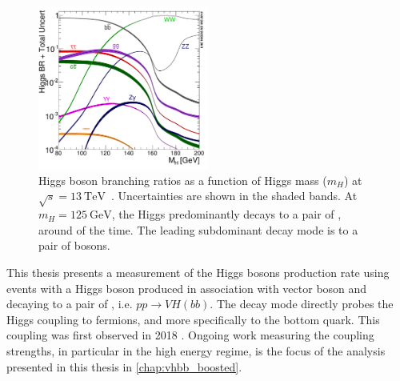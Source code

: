 \begin{figure}[!htbp]
  \centering
  \includegraphics[width=0.5\textwidth]{chapters/1.theory/figs/Higgs_BR_LM.pdf}
  \caption{
    Higgs boson branching ratios as a function of Higgs mass ($m_H$) at $\sqrt{s} = \SI{13}{\TeV}$~\cite{deFlorian:2016spz}.
    Uncertainties are shown in the shaded bands.
    At $m_H = \SI{125}{\GeV}$, the Higgs predominantly decays to a pair of \bquarks, around  of the time.
    The leading subdominant decay mode is to a pair of \Wboson bosons.
    }
  \label{fig:higgs_br}
\end{figure}

This thesis presents a measurement of the Higgs bosons production rate using events with a Higgs boson produced in association with vector boson and decaying to a pair of \bquarks, i.e. $pp \rightarrow VH(bb)$.
The \Hbb decay mode directly probes the Higgs coupling to fermions, and more specifically to the bottom quark.
This coupling was first observed in 2018 \cite{ATLAS-CONF-2018-036,CMS-HIG-18-016}.
Ongoing work measuring the coupling strengths, in particular in the high energy regime, is the focus of the analysis presented in this thesis in \cref{chap:vhbb_boosted}.
